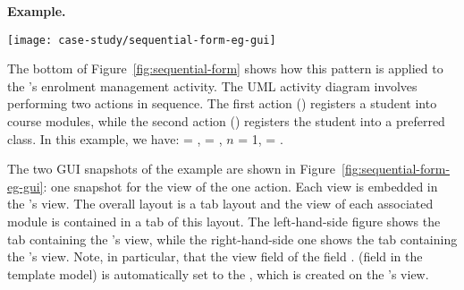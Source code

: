 \noindent\textbf{Example.} 
\begin{figure*}[ht]
	\begin{center}
		\texttt{[image: case-study/sequential-form-eg-gui]}
	\end{center}
	\vspace{-0.4cm}
	\caption{The sequential pattern form view of enrolment management activity.} %
	\label{fig:sequential-form-eg-gui}
		\vspace{-0.3cm}
\end{figure*}
The bottom of Figure~\ref{fig:sequential-form} shows how this pattern is applied to the \courseman's enrolment management activity.
The UML activity diagram involves performing two actions in sequence. The first action () registers a student into course modules, while the second action () registers the student into a preferred class. 
%
In this example, we have:  = ,  = , $ n $ = 1,  = .

The two GUI snapshots of the example are shown in Figure~\ref{fig:sequential-form-eg-gui}: one snapshot for the view of the one action. Each view is embedded in the 's view. The overall layout is a tab layout and the view of each associated module is contained in a tab of this layout. The left-hand-side figure shows the tab containing the 's view, while the right-hand-side one shows the tab containing the 's view. Note, in particular, that the view field of the field . (field  in the template model) is automatically set to the , which is created on the 's view.

